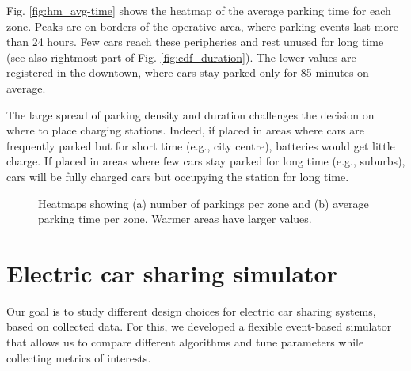 \documentclass[review, letterpaper,3p, 11pt]{elsarticle}
\begin{document}
Fig. \ref{fig:hm_avg-time} shows the heatmap of the average parking time for each zone. Peaks are on borders of the operative area, where parking events last more than 24 hours. Few cars reach these peripheries  and rest unused for long time (see also rightmost part of Fig. \ref{fig:cdf_duration}). The lower values are registered in the downtown, where cars stay parked only for 85 minutes on average.

The large spread of parking density and duration challenges the decision on where to place charging stations. Indeed, if placed in areas where cars are frequently parked but for short time (e.g., city centre), batteries would get little charge. If placed in areas where few cars stay parked for long time (e.g., suburbs),  cars will be fully charged cars but occupying the station for long time.

\begin{figure}[th]
    \centering     %
    	\caption{Heatmaps showing (a) number of parkings per zone  and (b) average parking time per zone. Warmer areas have larger values. }
    	\label{fig:data_car}
\end{figure}
\section{Electric car sharing simulator}
\label{sec:Modelling}

Our goal is to study different design choices for electric car sharing systems, based on collected data. For this, we developed a flexible event-based simulator that allows us to compare different algorithms and tune  parameters while collecting metrics of interests.
\end{document}
